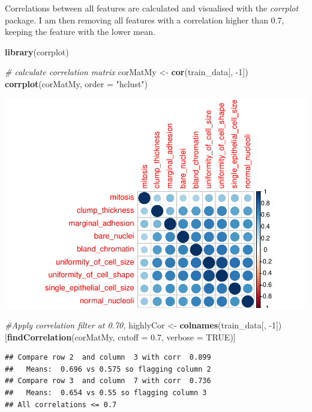 \documentclass[]{article}
\newenvironment{Shaded}{\begin{snugshade}}{\end{snugshade}}
\newcommand{\KeywordTok}[1]{\textcolor[rgb]{0.13,0.29,0.53}{\textbf{{#1}}}}
\newcommand{\DataTypeTok}[1]{\textcolor[rgb]{0.13,0.29,0.53}{{#1}}}
\newcommand{\DecValTok}[1]{\textcolor[rgb]{0.00,0.00,0.81}{{#1}}}
\newcommand{\FloatTok}[1]{\textcolor[rgb]{0.00,0.00,0.81}{{#1}}}
\newcommand{\StringTok}[1]{\textcolor[rgb]{0.31,0.60,0.02}{{#1}}}
\newcommand{\CommentTok}[1]{\textcolor[rgb]{0.56,0.35,0.01}{\textit{{#1}}}}
\newcommand{\OtherTok}[1]{\textcolor[rgb]{0.56,0.35,0.01}{{#1}}}
\newcommand{\NormalTok}[1]{{#1}}
\begin{document}
Correlations between all features are calculated and visualised with the
\emph{corrplot} package. I am then removing all features with a
correlation higher than 0.7, keeping the feature with the lower mean.

\begin{Shaded}
\begin{Highlighting}[]
\KeywordTok{library}\NormalTok{(corrplot)}

\CommentTok{# calculate correlation matrix}
\NormalTok{corMatMy <-}\StringTok{ }\KeywordTok{cor}\NormalTok{(train_data[, -}\DecValTok{1}\NormalTok{])}
\KeywordTok{corrplot}\NormalTok{(corMatMy, }\DataTypeTok{order =} \StringTok{"hclust"}\NormalTok{)}
\end{Highlighting}
\end{Shaded}

\includegraphics{webinar_code_files/figure-latex/unnamed-chunk-25-1.pdf}

\begin{Shaded}
\begin{Highlighting}[]
\CommentTok{#Apply correlation filter at 0.70,}
\NormalTok{highlyCor <-}\StringTok{ }\KeywordTok{colnames}\NormalTok{(train_data[, -}\DecValTok{1}\NormalTok{])[}\KeywordTok{findCorrelation}\NormalTok{(corMatMy, }\DataTypeTok{cutoff =} \FloatTok{0.7}\NormalTok{, }\DataTypeTok{verbose =} \OtherTok{TRUE}\NormalTok{)]}
\end{Highlighting}
\end{Shaded}

\begin{verbatim}
## Compare row 2  and column  3 with corr  0.899 
##   Means:  0.696 vs 0.575 so flagging column 2 
## Compare row 3  and column  7 with corr  0.736 
##   Means:  0.654 vs 0.55 so flagging column 3 
## All correlations <= 0.7
\end{verbatim}
\end{document}
